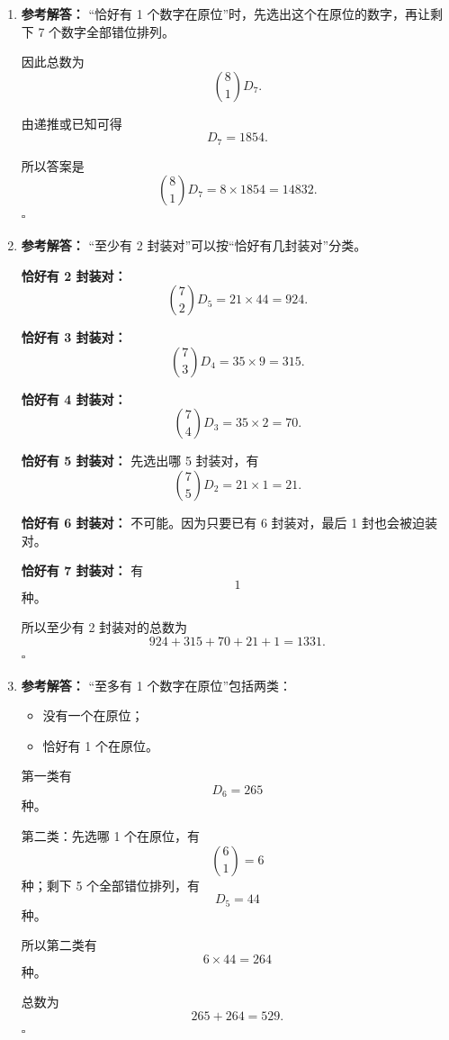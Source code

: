 \documentclass[11pt,a4paper,fontset=fandol]{ctexart}
\newenvironment{solution}{\par\noindent\textbf{参考解答：}}{\hfill$\square$\par}
\begin{document}
\begin{enumerate}
\begin{solution}
  所以
  \[
  D_6=720-720+360-120+30-6+1.
  \]

  计算得
  \[
  D_6=265.
  \]
  \end{solution}

  \item \begin{solution}
  “恰好有 1 个数字在原位”时，先选出这个在原位的数字，再让剩下 7 个数字全部错位排列。

  因此总数为
  \[
  \binom81 D_7.
  \]

  由递推或已知可得
  \[
  D_7=1854.
  \]

  所以答案是
  \[
  \binom81 D_7=8\times 1854=14832.
  \]
  \end{solution}

  \item \begin{solution}
  “至少有 2 封装对”可以按“恰好有几封装对”分类。

  \textbf{恰好有 2 封装对：}
  \[
  \binom72 D_5=21\times 44=924.
  \]

  \textbf{恰好有 3 封装对：}
  \[
  \binom73 D_4=35\times 9=315.
  \]

  \textbf{恰好有 4 封装对：}
  \[
  \binom74 D_3=35\times 2=70.
  \]

  \textbf{恰好有 5 封装对：}
  先选出哪 5 封装对，有
  \[
  \binom75 D_2=21\times 1=21.
  \]

  \textbf{恰好有 6 封装对：}
  不可能。因为只要已有 6 封装对，最后 1 封也会被迫装对。

  \textbf{恰好有 7 封装对：}
  有
  \[
  1
  \]
  种。

  所以至少有 2 封装对的总数为
  \[
  924+315+70+21+1=1331.
  \]
  \end{solution}

  \item \begin{solution}
  “至多有 1 个数字在原位”包括两类：
  \begin{itemize}
    \item 没有一个在原位；
    \item 恰好有 1 个在原位。
  \end{itemize}

  第一类有
  \[
  D_6=265
  \]
  种。

  第二类：先选哪 1 个在原位，有
  \[
  \binom61=6
  \]
  种；剩下 5 个全部错位排列，有
  \[
  D_5=44
  \]
  种。

  所以第二类有
  \[
  6\times 44=264
  \]
  种。

  总数为
  \[
  265+264=529.
  \]
  \end{solution}


\end{enumerate}
\end{document}
